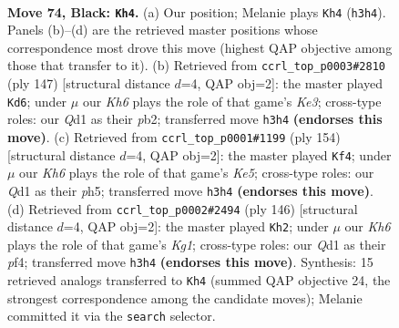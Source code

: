 \documentclass[11pt]{article}
\begin{document}
\clearpage

\begin{figure}[p]\centering
\begin{subfigure}{0.46\textwidth}\centering
\resizebox{\linewidth}{!}{%
\newchessgame
\chessboard[
  setfen={8/8/1p6/p7/2P5/7k/1K6/3q4 b - - 5 74},
  showmover=false,
  pgfstyle=straightmove, color=movearrow, markmove={h3-h4}
]}
\caption{}
\end{subfigure}\hfill
\begin{subfigure}{0.46\textwidth}\centering
\resizebox{\linewidth}{!}{%
\newchessgame
\chessboard[
  setfen={8/6p1/4k1Pp/8/4K3/8/1P6/8 b - - 0 74},
  showmover=false,
  pgfstyle=straightmove, color=movearrow, markmove={e6-d6}
]}
\caption{}
\end{subfigure}
\\[4pt]
\begin{subfigure}{0.46\textwidth}\centering
\resizebox{\linewidth}{!}{%
\newchessgame
\chessboard[
  setfen={5k2/8/8/p3K2p/2P5/1P6/8/8 w - - 3 78},
  showmover=false,
  pgfstyle=straightmove, color=movearrow, markmove={e5-f4}
]}
\caption{}
\end{subfigure}\hfill
\begin{subfigure}{0.46\textwidth}\centering
\resizebox{\linewidth}{!}{%
\newchessgame
\chessboard[
  setfen={8/8/8/3k2Pp/5p1P/8/8/6K1 w - - 12 74},
  showmover=false,
  pgfstyle=straightmove, color=movearrow, markmove={g1-h2}
]}
\caption{}
\end{subfigure}
\caption{\textbf{Move 74, Black: \texttt{Kh4}.} (a) Our position; Melanie plays \texttt{Kh4} (\texttt{h3h4}). Panels (b)--(d) are the retrieved master positions whose correspondence most drove this move (highest QAP objective among those that transfer to it). (b) Retrieved from \texttt{ccrl\_top\_p0003\#2810} (ply 147) [structural distance $d$=4, QAP obj=2]: the master played \texttt{Kd6}; under $\mu$ our \emph{Kh6} plays the role of that game's \emph{Ke3}; cross-type roles: our \emph{Q}d1 as their \emph{p}b2; transferred move \texttt{h3h4} \textbf{(endorses this move)}. (c) Retrieved from \texttt{ccrl\_top\_p0001\#1199} (ply 154) [structural distance $d$=4, QAP obj=2]: the master played \texttt{Kf4}; under $\mu$ our \emph{Kh6} plays the role of that game's \emph{Ke5}; cross-type roles: our \emph{Q}d1 as their \emph{p}h5; transferred move \texttt{h3h4} \textbf{(endorses this move)}. (d) Retrieved from \texttt{ccrl\_top\_p0002\#2494} (ply 146) [structural distance $d$=4, QAP obj=2]: the master played \texttt{Kh2}; under $\mu$ our \emph{Kh6} plays the role of that game's \emph{Kg1}; cross-type roles: our \emph{Q}d1 as their \emph{p}f4; transferred move \texttt{h3h4} \textbf{(endorses this move)}. Synthesis: 15 retrieved analogs transferred to \texttt{Kh4} (summed QAP objective 24, the strongest correspondence among the candidate moves); Melanie committed it via the \texttt{search} selector.}
\label{fig:thought-m147}
\end{figure}
\end{document}
